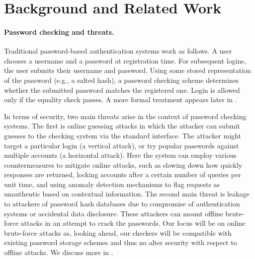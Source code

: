\section{Background and Related Work}
\label{sec:background}


\paragraph{Password checking and threats.} 
Traditional password-based authentication systems work as follows. A
user chooses a username and a password at registration time.  For subsequent
logins, the user submits their username and password.  Using some stored representation of the password (e.g., a salted hash), a password checking
scheme determines whether the submitted password matches the registered one.
Login is allowed only if the equality check passes. A more formal
treatment appears later in . 

In terms of security, two main threats arise in the context of password checking
systems. The first is online guessing attacks in which the attacker can submit
guesses to the checking system via the standard interface. The attacker might
target a particular login (a vertical attack), or try popular passwords against
multiple accounts (a horizontal attack). Here the system can employ various
countermeasures to mitigate online attacks, such as slowing down how quickly
responses are returned, locking accounts after a certain number of queries per
unit time, and using anomaly detection mechanisms to flag requests as
unauthentic based on contextual information.  The second main threat is leakage to attackers of
password hash databases due to compromise of authentication systems or
accidental data disclosure. These attackers can mount offline
brute-force attacks in an attempt to crack the passwords. Our focus will be on
online brute-force attacks as, looking ahead, our checkers will be compatible
with existing password storage schemes and thus no alter security with respect to offline
attacks. We discuss more in .

